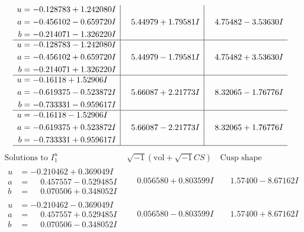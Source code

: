\documentclass[1p]{elsarticle_modified}
\theoremstyle{definition}
\newcommand{\I}{\sqrt{-1}}
\begin{document}
$$\begin{array}{c|c|c}
\begin{aligned}
u &= -0.128783 + 1.242080 I \\
a &= -0.456102 - 0.659720 I \\
b &= -0.214071 - 1.326220 I\end{aligned}
 & \phantom{-}5.44979 + 1.79581 I & \phantom{-}4.75482 - 3.53630 I \\ \hline\begin{aligned}
u &= -0.128783 - 1.242080 I \\
a &= -0.456102 + 0.659720 I \\
b &= -0.214071 + 1.326220 I\end{aligned}
 & \phantom{-}5.44979 - 1.79581 I & \phantom{-}4.75482 + 3.53630 I \\ \hline\begin{aligned}
u &= -0.16118 + 1.52906 I \\
a &= -0.619375 - 0.523872 I \\
b &= -0.733331 - 0.959617 I\end{aligned}
 & \phantom{-}5.66087 + 2.21773 I & \phantom{-}8.32065 - 1.76776 I \\ \hline\begin{aligned}
u &= -0.16118 - 1.52906 I \\
a &= -0.619375 + 0.523872 I \\
b &= -0.733331 + 0.959617 I\end{aligned}
 & \phantom{-}5.66087 - 2.21773 I & \phantom{-}8.32065 + 1.76776 I\\
 \hline 
 \end{array}$$\newpage$$\begin{array}{c|c|c}  
\text{Solutions to }I^u_{1}& \I (\text{vol} + \sqrt{-1}CS) & \text{Cusp shape}\\
 \hline 
\begin{aligned}
u &= -0.210462 + 0.369049 I \\
a &= \phantom{-}0.457557 - 0.529485 I \\
b &= \phantom{-}0.070506 + 0.348052 I\end{aligned}
 & \phantom{-}0.056580 + 0.803599 I & \phantom{-}1.57400 - 8.67162 I \\ \hline\begin{aligned}
u &= -0.210462 - 0.369049 I \\
a &= \phantom{-}0.457557 + 0.529485 I \\
b &= \phantom{-}0.070506 - 0.348052 I\end{aligned}
 & \phantom{-}0.056580 - 0.803599 I & \phantom{-}1.57400 + 8.67162 I \\ \hline\begin{aligned}

\end{aligned}
\end{array}$$
\end{document}
